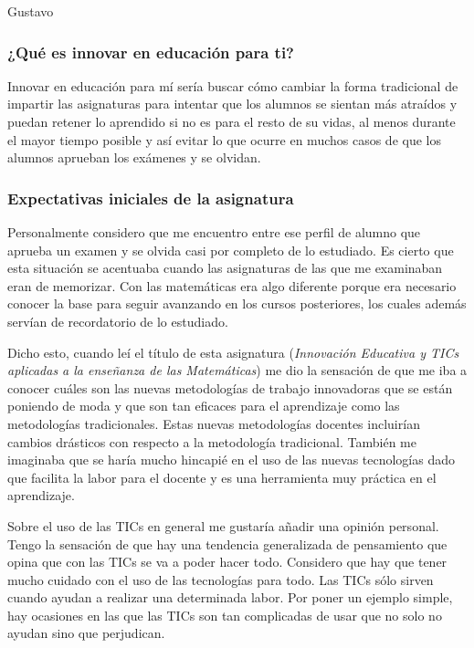 
\begin{opin}{\guscolor}{Gustavo}


\subsubsection{¿Qué es innovar en educación para ti?}
Innovar en educación para mí sería buscar cómo cambiar la forma tradicional de impartir las asignaturas para intentar que los alumnos se sientan más atraídos y puedan retener lo aprendido si no es para el resto de su vidas, al menos durante el mayor tiempo posible y así evitar lo que ocurre en muchos casos de que los alumnos aprueban los exámenes y se olvidan.


\subsubsection{Expectativas iniciales de la asignatura}
Personalmente considero que me encuentro entre ese perfil de alumno que aprueba un examen y se olvida casi por completo de  lo estudiado. Es cierto que esta situación se acentuaba cuando las asignaturas de las que me examinaban eran de memorizar. Con las matemáticas era algo diferente porque era necesario conocer la base para seguir avanzando en los cursos posteriores, los cuales además servían de recordatorio de lo estudiado.


Dicho esto, cuando leí el título de esta asignatura (\textit{Innovación Educativa y TICs aplicadas a la enseñanza de las Matemáticas}) me dio la sensación de que me iba a conocer cuáles son las nuevas metodologías de trabajo innovadoras que se están poniendo de moda y que son tan eficaces para el aprendizaje como las metodologías tradicionales. Estas nuevas metodologías docentes incluirían cambios drásticos con respecto a la metodología tradicional. También me imaginaba que se haría mucho hincapié en el uso de las nuevas tecnologías dado que facilita la labor para el docente y es una herramienta muy práctica en el aprendizaje.


Sobre el uso de las TICs en general me gustaría añadir una opinión personal. Tengo la sensación de que hay una tendencia generalizada de pensamiento que opina que con las TICs se va a poder hacer todo. Considero que hay que tener mucho cuidado con el uso de las tecnologías para todo. Las TICs sólo sirven cuando ayudan a realizar una determinada labor. Por poner un ejemplo simple, hay ocasiones en las que las TICs son tan complicadas de usar que no solo no ayudan sino que perjudican.

\end{opin}

